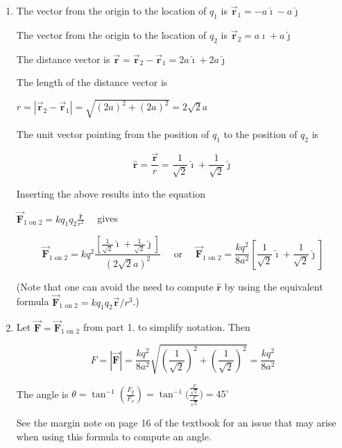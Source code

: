 \documentclass{article}
\renewcommand{\mbox}{\text}
\newcommand{\ihat}[0]{\hat{\boldsymbol{\imath}}}
\newcommand{\jhat}[0]{\hat{\boldsymbol{\jmath}}}
\newcommand{\rhat}[0]{\hat{\mathbf{r}}}
\newcommand{\bfvec}[1]{\vec{\mathbf{#1}}}
\begin{document}
    \begin{enumerate}

      \item The vector from the origin to the location of $q_1$ is $\bfvec{r}_1=-a\ihat -a\jhat$

            The vector from the origin to the location of $q_2$ is $\bfvec{r}_2=a\ihat + a\jhat$

            The distance vector is $\bfvec{r}=\bfvec{r}_2-\bfvec{r}_1=2a\ihat+2a\jhat$

            The length of the distance vector is

            $r=|\bfvec{r}_2-\bfvec{r}_1|=\sqrt{(2a)^2 + (2a)^2} = 2\sqrt{2}a$

            The unit vector pointing from the position of $q_1$ to the position of $q_2$ is

        \begin{equation}
        \rhat=\frac{\bfvec{r}}{r}=\frac{1}{\sqrt{2}}\ihat + \frac{1}{\sqrt{2}}\jhat
        \end{equation}

            Inserting the above results into the equation

            $\displaystyle \bfvec{F}_{1\mbox{ on } 2}=kq_1q_2\frac{\rhat}{r^2}\quad$ gives

        \begin{equation}
        \bfvec{F}_{1\mbox{ on } 2}=
         kq^2\frac{\left[\frac{1}{\sqrt{2}}\ihat + \frac{1}{\sqrt{2}}\jhat\right]}{(2\sqrt{2}a)^2}
         \quad\text{ or }\quad
         \bfvec{F}_{1\mbox{ on } 2}=
         \frac{kq^2}{8a^2}\left[\frac{1}{\sqrt{2}}\ihat + \frac{1}{\sqrt{2}}\jhat\right]
         \end{equation}

            (Note that one can avoid the need to compute $\rhat$ by using the equivalent formula $\displaystyle \bfvec{F}_{1\mbox{ on } 2}=kq_1q_2{\bfvec{r}}/{r^3}$.)

      \item Let $\bfvec{F} = \bfvec{F}_{1\mbox{ on } 2}$ from part 1. to simplify notation. Then

        \begin{equation}
        F=|\bfvec{F}|=\frac{kq^2}{8a^2}\sqrt{\left(\frac{1}{\sqrt{2}}\right)^2 + \left(\frac{1}{\sqrt{2}}\right)^2}=\frac{kq^2}{8a^2}
        \end{equation}

            The angle is $\displaystyle \theta = \tan^{-1}\left(\frac{F_y}{F_x}\right) = \tan^{-1}\bigg( \frac{\frac{F}{\sqrt{2}}}{\frac{F}{\sqrt{2}}}\bigg)=45^\circ$

            See the margin note on page 16 of the textbook for an issue that may arise when using this formula to compute an angle.

    \end{enumerate}
\fi
\end{document}
